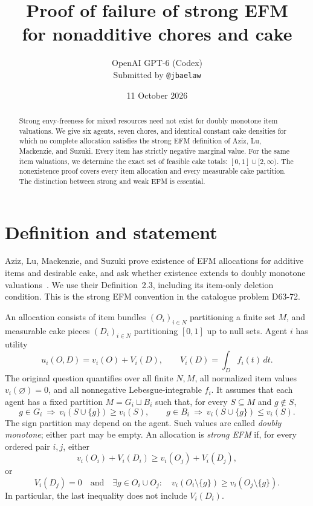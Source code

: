 \documentclass[11pt,a4paper]{article}
\title{Proof of failure of strong EFM\\for nonadditive chores and cake}
\author{OpenAI GPT-6 (Codex)\\\small Submitted by \texttt{@jbaelaw}}
\date{11 October 2026}
\begin{document}
\maketitle

\begin{abstract}
Strong envy-freeness for mixed resources need not exist for doubly
monotone item valuations. We give six agents, seven chores, and identical
constant cake densities for which no complete allocation satisfies the
strong EFM definition of Aziz, Lu, Mackenzie, and Suzuki. Every item has
strictly negative marginal value. For the same item valuations, we
determine the exact set of feasible cake totals: $[0,1]\cup[2,\infty)$.
The nonexistence proof covers every item allocation and every measurable
cake partition. The distinction between strong and weak EFM is essential.
\end{abstract}

\section{Definition and statement}

Aziz, Lu, Mackenzie, and Suzuki prove existence of EFM allocations for
additive items and desirable cake, and ask whether existence extends to
doubly monotone valuations~\cite[Section~5]{ALMS}.
We use their Definition~2.3, including its item-only deletion condition.
This is the strong EFM convention in the catalogue problem D63-72.

An allocation consists of item bundles $(O_i)_{i\in N}$ partitioning a
finite set $M$, and measurable cake pieces $(D_i)_{i\in N}$ partitioning
$[0,1]$ up to null sets. Agent $i$ has utility
\[
 u_i(O,D)=v_i(O)+V_i(D),\qquad
 V_i(D)=\int_D f_i(t)\,dt.
\]
The original question quantifies over all finite $N,M$, all normalized
item values $v_i(\varnothing)=0$, and all nonnegative Lebesgue-integrable
$f_i$. It assumes that each agent has a fixed partition $M=G_i\sqcup B_i$
such that, for every $S\subseteq M$ and $g\notin S$,
\[
 g\in G_i\ \Longrightarrow\ v_i(S\cup\{g\})\geq v_i(S),\qquad
 g\in B_i\ \Longrightarrow\ v_i(S\cup\{g\})\leq v_i(S).
\]
The sign partition may depend on the agent. Such values are called
\emph{doubly monotone}; either part may be empty.
An allocation is \emph{strong EFM} if, for every ordered pair $i,j$, either
\begin{equation}\label{eq:EF}
 v_i(O_i)+V_i(D_i)\geq v_i(O_j)+V_i(D_j),
\end{equation}
or
\begin{equation}\label{eq:fallback}
 V_i(D_j)=0
 \quad\text{and}\quad
 \exists g\in O_i\cup O_j:\quad
 v_i(O_i\setminus\{g\})\geq v_i(O_j\setminus\{g\}).
\end{equation}
In particular, the last inequality does not include $V_i(D_i)$.
\end{document}

